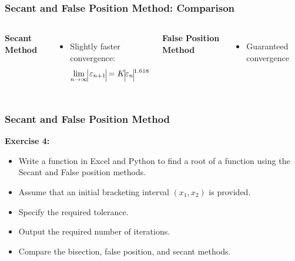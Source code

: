   \begin{frame}[fragile]
    \frametitle{Secant and False Position Method: Comparison}

    \begin{columns}
        \textbf{Secant Method}
        \vspace{0.1cm}
        \newline 
        
        
      
        \begin{itemize}
          \item Slightly faster convergence:
          \[
          \lim_{n \to \infty} \vline\varepsilon_{n+1}\vline = K\vline\varepsilon_n\vline^{1.618}
          \]
        \end{itemize}
  
        \textbf{False Position Method}
        \vspace{0.3cm}
        \newline 
          
        \begin{itemize}
          \item Guaranteed convergence
        \end{itemize}
    \end{columns}
  \end{frame}

\begin{frame}[fragile]
  \frametitle{Secant and False Position Method}

  \textbf{Exercise 4:}
  \begin{itemize}
    \item Write a function in Excel and Python to find a root of a function using the Secant and False position methods.
    \item Assume that an initial bracketing interval \((x_1, x_2)\) is provided.
    \item Specify the required tolerance.
    \item Output the required number of iterations.
    \item Compare the bisection, false position, and secant methods.
  \end{itemize}
\end{frame}


